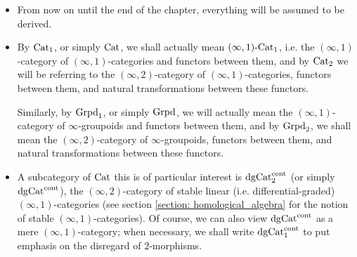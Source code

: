         \begin{convention} \label{conv: schemes_2_everything_is_derived}
            \noindent
            \begin{itemize}
                \item From now on until the end of the chapter, everything will be assumed to be derived. 
                \item By $\mathrm{Cat}_1$, or simply $\mathrm{Cat}$, we shall actually mean $(\infty, 1)\text{-}\mathrm{Cat}_1$, i.e. the $(\infty, 1)$-category of $(\infty, 1)$-categories and functors between them, and by $\mathrm{Cat}_2$ we will be referring to the $(\infty, 2)$-category of $(\infty, 1)$-categories, functors between them, and natural transformations between these functors. 
                
                Similarly, by $\mathrm{Grpd}_1$, or simply $\mathrm{Grpd}$, we will actually mean the $(\infty, 1)$-category of $\infty$-groupoids and functors between them, and by $\mathrm{Grpd}_2$, we shall mean the $(\infty, 2)$-category of $\infty$-groupoids, functors between them, and natural transformations between these functors.
                \item A subcategory of $\mathrm{Cat}$ this is of particular interest is $\mathrm{dg}\mathrm{Cat}^{\mathrm{cont}}_2$ (or simply $\mathrm{dg}\mathrm{Cat}^{\mathrm{cont}}$), the $(\infty, 2)$-category of stable linear (i.e. differential-graded) $(\infty, 1)$-categories (see section \ref{section: homological_algebra} for the notion of stable $(\infty, 1)$-categories). Of course, we can also view $\mathrm{dg}\mathrm{Cat}^{\mathrm{cont}}$ as a mere $(\infty, 1)$-category; when necessary, we shall write $\mathrm{dg}\mathrm{Cat}^{\mathrm{cont}}_1$ to put emphasis on the disregard of $2$-morphisms.
            \end{itemize} 
        \end{convention}
        
